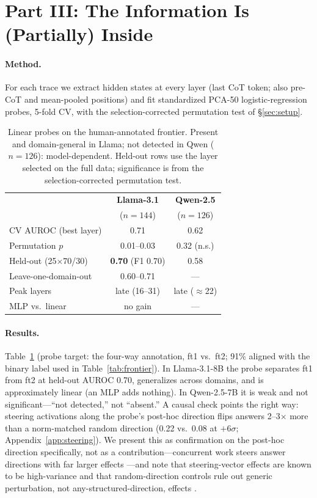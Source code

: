 \documentclass[11pt]{article}
\begin{document}
\section{Part III: The Information Is (Partially) Inside}
\label{sec:internals}

\paragraph{Method.} For each trace we extract hidden states at every layer (last CoT token; also pre-CoT and mean-pooled positions) and fit standardized PCA-50 logistic-regression probes, 5-fold CV, with the selection-corrected permutation test of \S\ref{sec:setup}.

\begin{table}[t]
\centering
\small
\begin{tabular}{@{}lcc@{}}
\toprule
 & \textbf{Llama-3.1} & \textbf{Qwen-2.5} \\
 & ($n{=}144$) & ($n{=}126$) \\
\midrule
CV AUROC (best layer) & 0.71 & 0.62 \\
Permutation $p$ & 0.01--0.03 & 0.32 (n.s.) \\
Held-out (25$\times$70/30) & \textbf{0.70} (F1 0.70) & 0.58 \\
Leave-one-domain-out & 0.60--0.71 & --- \\
Peak layers & late (16--31) & late ($\approx$22) \\
MLP vs.\ linear & no gain & --- \\
\bottomrule
\end{tabular}
\caption{Linear probes on the human-annotated frontier. Present and domain-general in Llama; not detected in Qwen ($n{=}126$): model-dependent. Held-out rows use the layer selected on the full data; significance is from the selection-corrected permutation test.}
\label{tab:whitebox}
\end{table}

\paragraph{Results.} Table~\ref{tab:whitebox} (probe target: the four-way annotation, ft1 vs.\ ft2; 91\% aligned with the binary label used in Table~\ref{tab:frontier}). In Llama-3.1-8B the probe separates ft1 from ft2 at held-out AUROC 0.70, generalizes across domains, and is approximately linear (an MLP adds nothing). In Qwen-2.5-7B it is weak and not significant---``not detected,'' not ``absent.'' A causal check points the right way: steering activations along the probe's post-hoc direction flips answers 2--3$\times$ more than a norm-matched random direction (0.22 vs.\ 0.08 at $+6\sigma$; Appendix~\ref{app:steering}). We present this as confirmation on the post-hoc direction specifically, not as a contribution---concurrent work steers answer directions with far larger effects \citep{cox2026decoding}---and note that steering-vector effects are known to be high-variance and that random-direction controls rule out generic perturbation, not any-structured-direction, effects \citep{tan2024analysing}.
\end{document}
